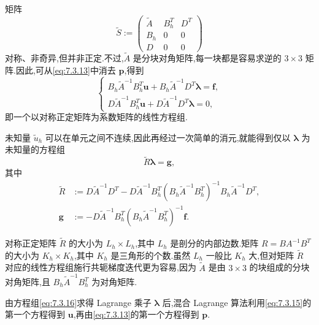 \begin{example}
矩阵
\begin{equation}\label{eq:7.3.14}
  \widetilde S:=\begin{pmatrix}
    \widetilde A&B_h^T&D^T\\
    B_h&0&0\\
    D&0&0
  \end{pmatrix}
\end{equation}
对称、非奇异,但并非正定.不过,\(\widetilde A\) 是分块对角矩阵,每一块都是容易求逆的 \(3\times3\) 矩阵.因此,可从\eqref{eq:7.3.13}中消去 \(\boldsymbol{p}\),得到
\begin{equation}\label{eq:7.3.15}
  \begin{cases}
    B_h\widetilde A^{-1}B_h^T\boldsymbol{u}+B_h\widetilde A^{-1}D^T\boldsymbol{\lambda}=\boldsymbol{f},\\
    D\widetilde A^{-1}B_h^T\boldsymbol{u}+D\widetilde A^{-1}D^T\boldsymbol{\lambda}=0,
  \end{cases}
\end{equation}
即一个以对称正定矩阵为系数矩阵的线性方程组.

未知量 \(\widetilde u_h\) 可以在单元之间不连续,因此再经过一次简单的消元,就能得到仅以 \(\boldsymbol{\lambda}\) 为未知量的方程组
\begin{equation}\label{eq:7.3.16}
  \widetilde R\boldsymbol{\lambda}=\boldsymbol{g},
\end{equation}
其中
\begin{equation}\label{eq:7.3.17}
  \begin{aligned}
    \widetilde R
      &:=D\widetilde A^{-1}D^T
        -D\widetilde A^{-1}B_h^T(B_h\widetilde A^{-1}B_h^T)^{-1}B_h\widetilde A^{-1}D^T,\\
    \boldsymbol{g}&:=-D\widetilde A^{-1}B_h^T(B_h\widetilde A^{-1}B_h^T)^{-1}\boldsymbol{f}.
  \end{aligned}
\end{equation}

对称正定矩阵 \(\widetilde R\) 的大小为 \(L_h\times L_h\),其中 \(L_h\) 是剖分的内部边数.矩阵 \(R=BA^{-1}B^T\) 的大小为 \(K_h\times K_h\),其中 \(K_h\) 是三角形的个数.虽然 \(L_h\) 一般比 \(K_h\) 大,但对矩阵 \(\widetilde R\) 对应的线性方程组施行共轭梯度迭代更为容易,因为 \(\widetilde A\) 是由 \(3\times3\) 的块组成的分块对角矩阵,且 \(B_h\widetilde A^{-1}B_h^T\) 为对角矩阵.

由方程组\eqref{eq:7.3.16}求得 Lagrange 乘子 \(\boldsymbol{\lambda}\) 后,混合 Lagrange 算法利用\eqref{eq:7.3.15}的第一个方程得到 \(\boldsymbol{u}\),再由\eqref{eq:7.3.13}的第一个方程得到 \(\boldsymbol{p}\).
\end{example}

